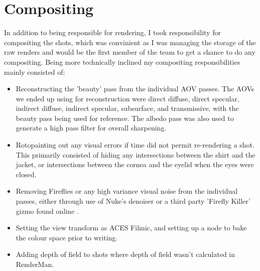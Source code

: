 \documentclass[11pt]{article}
\begin{document}



\cite{pssh}
\cite{martin_2008}

\section{Compositing}

In addition to being responsible for rendering, I took responsibility for compositing the shots, which was convinient as I was managing the storage of the raw renders and would be the first member of the team to get a chance to do any compositing. Being more technically inclined my compositing responsibilities mainly consisted of:

\begin{itemize}

\item Reconstructing the 'beauty' pass from the individual AOV passes. The AOVs we ended up using for reconstruction were direct diffuse, direct specular, indirect diffuse, indirect specular, subsurface, and transmissive, with the beauty pass being used for reference. The albedo pass was also used to generate a high pass filter for overall sharpening.

\item Rotopainting out any visual errors if time did not permit re-rendering a shot. This primarily consisted of hiding any intersections between the shirt and the jacket, or intersections between the cornea and the eyelid when the eyes were closed.

\item Removing Fireflies or any high variance visual noise from the individual passes, either through use of Nuke's denoiser or a third party 'Firefly Killer' gizmo found online \cite{muller_2015}.

\item Setting the view transform as ACES Filmic, and setting up a node to bake the colour space prior to writing.

\item Adding depth of field to shots where depth of field wasn't calculated in RenderMan.

\end{itemize}
\end{document}
